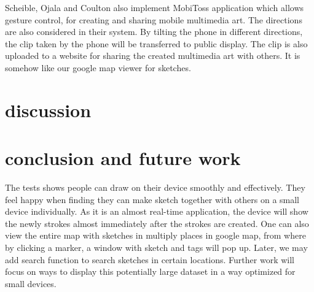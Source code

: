 \documentclass{chi2009}
\begin{document}
Scheible, Ojala and Coulton \cite{mobitoss:scheible} also implement MobiToss application which allows gesture control, for creating and sharing mobile multimedia art. The directions are also considered in their system. By tilting the phone in different directions, the clip taken by the phone will be transferred to public display. The clip is also uploaded to a website for sharing the created multimedia art with others. It is somehow like our google map viewer for sketches.

\section{discussion}

\section{conclusion and future work}
The tests shows people can draw on their device smoothly and effectively. They feel happy when finding they can make sketch together with others on a small device individually. As it is an almost real-time application, the device will show the newly strokes almost immediately after the strokes are created. One can also view the entire map with sketches in multiply places in google map, from where by clicking a marker, a window with sketch and tags will pop up. Later, we may add search function to search sketches in certain locations. Further work will focus on ways to display this potentially large dataset in a way optimized for small devices.




\end{document}
